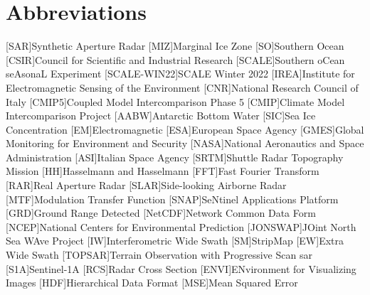 

\chapter*{Abbreviations}
\begin{acronym}
        [SAR]{Synthetic Aperture Radar}
        [MIZ]{Marginal Ice Zone}
        [SO]{Southern Ocean}
        [CSIR]{Council for Scientific and Industrial Research}
        [SCALE]{Southern oCean seAsonaL Experiment}
        [SCALE-WIN22]{SCALE Winter 2022}
        [IREA]{Institute for Electromagnetic Sensing of the Environment}
        [CNR]{National Research Council of Italy}
        [CMIP5]{Coupled Model Intercomparison Phase 5}
        [CMIP]{Climate Model Intercomparison Project}
        [AABW]{Antarctic Bottom Water}
        [SIC]{Sea Ice Concentration}
        [EM]{Electromagnetic}
        [ESA]{European Space Agency}
        [GMES]{Global Monitoring for Environment and Security}
        [NASA]{National Aeronautics and Space Administration}
        [ASI]{Italian Space Agency}
        [SRTM]{Shuttle Radar Topography Mission}
        [HH]{Hasselmann and Hasselmann}
        [FFT]{Fast Fourier Transform}
        [RAR]{Real Aperture Radar}
        [SLAR]{Side-looking Airborne Radar}
        [MTF]{Modulation Transfer Function}
        [SNAP]{SeNtinel Applications Platform}
        [GRD]{Ground Range Detected}
        [NetCDF]{Network Common Data Form}
        [NCEP]{National Centers for Environmental Prediction}
        [JONSWAP]{JOint North Sea WAve Project}
        [IW]{Interferometric Wide Swath}
        [SM]{StripMap}
        [EW]{Extra Wide Swath}
        [TOPSAR]{Terrain Observation with Progressive Scan \acs{sar}}
        [S1A]{Sentinel-1A}
        [RCS]{Radar Cross Section}
        [ENVI]{ENvironment for Visualizing Images}
        [HDF]{Hierarchical Data Format}
        [MSE]{Mean Squared Error}
\end{acronym}
